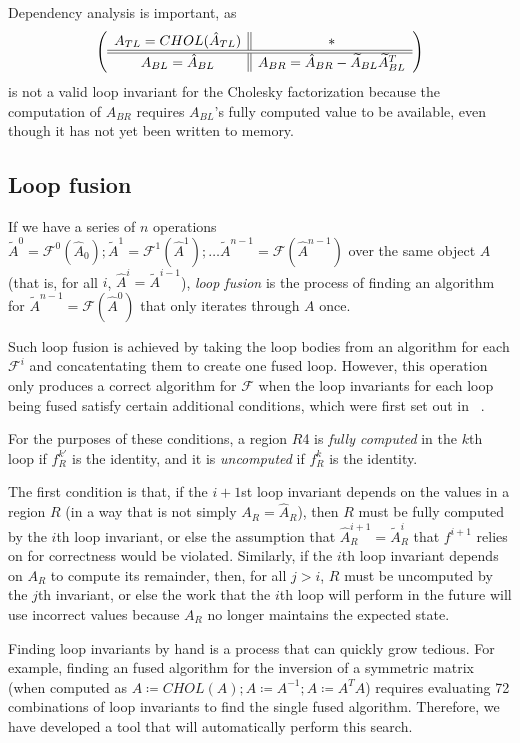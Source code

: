 \documentclass[12pt,letterpaper]{article}
\newcommand*{\mycite}[1]{~\cite{#1}}
\newcommand*{\opF}{\mathcal{F}}
\newcommand*{\opf}{f}
\begin{document}
Dependency analysis is important, as
\begin{equation*}
  \left( \begin{array}{c || c} A_{TL} = CHOL(\hat{A}_{TL}) & * \\ \hline \hline A_{BL} = \hat{A}_{BL} & A_{BR} = \hat{A}_{BR} - \widetilde{A}_{BL}\widetilde{A}_{BL}^T \end{array} \right)
\end{equation*}
is not a valid loop invariant for the Cholesky factorization because the computation of $A_{BR}$ requires $A_{BL}$'s fully computed value to be available, even though it has not yet been written to memory.

\subsection{Loop fusion}
If we have a series of $n$ operations $\widetilde{A}^0 = \opF^0(\hat{A}_0); \widetilde{A}^1 = \opF^1(\hat{A}^1); \ldots \widetilde{A}^{n - 1} = \opF(\hat{A}^{n - 1})$
over the same object $A$ (that is, for all $i$, $\hat{A}^i = \widetilde{A}^{i - 1}$), \emph{loop fusion} is the process of finding an algorithm for $\widetilde{A}^{n - 1} = \opF(\hat{A}^0)$ that only iterates through $A$ once.

Such loop fusion is achieved by taking the loop bodies from an algorithm for each $\opF^i$ and concatentating them to create one fused loop.
However, this operation only produces a correct algorithm for $\opF$ when the loop invariants for each loop being fused satisfy certain additional conditions, which were first set out in \mycite{Low2013}.

For the purposes of these conditions, a region $R$4 is \emph{fully computed} in the $k$th loop if $\opf_R^{k'}$ is the identity, and it is \emph{uncomputed} if $\opf_R^k$ is the identity.

The first condition is that, if the $i + 1$st loop invariant depends on the values in a region $R$ (in a way that is not simply $A_R = \hat{A}_R$), then $R$ must be fully computed by the $i$th loop invariant, or else the assumption that $\hat{A}^{i + 1}_R = \widetilde{A}^i_R$ that $\opf^{i + 1}$ relies on for correctness would be violated.
Similarly, if the $i$th loop invariant depends on $A_R$ to compute its remainder, then, for all $j > i$, $R$ must be uncomputed by the $j$th invariant, or else the work that the $i$th loop will perform in the future will use incorrect values because $A_R$ no longer maintains the expected state.

Finding loop invariants by hand is a process that can quickly grow tedious.
For example, finding an fused algorithm for the inversion of a symmetric matrix (when computed as $A \coloneqq CHOL(A); A \coloneqq A^{-1}; A \coloneqq A^TA$) requires evaluating 72 combinations of loop invariants to find the single fused algorithm.
Therefore, we have developed a tool that will automatically perform this search.
\end{document}
